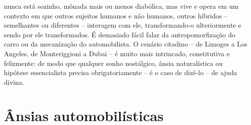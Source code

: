 \begin{multicols}{2}
nunca está sozinho,\allowbreak{} mônada mais ou menos diabólica,\allowbreak{} mas vive e opera em um contexto em que outros sujeitos humanos e não humanos,\allowbreak{} outros híbridos – semelhantes ou diferentes – interagem com ele,\allowbreak{} transformando-\allowbreak{}o ulteriormente e sendo por ele transformados.\allowbreak{} É demasiado fácil falar da antropomorfização do carro ou da mecanização do automobilista.\allowbreak{} O cenário citadino – de Limoges a Los Angeles,\allowbreak{} de Monteriggioni a Dubai – é muito mais intrincado,\allowbreak{} constitutiva e felizmente:\allowbreak{} de modo que qualquer sonho nostálgico,\allowbreak{} ânsia naturalística ou hipótese essencialista precisa obrigatoriamente – é o caso de dizê-\allowbreak{}lo – de ajuda divina.\allowbreak{}
\section*{Ânsias automobilísticas}

\end{multicols}
